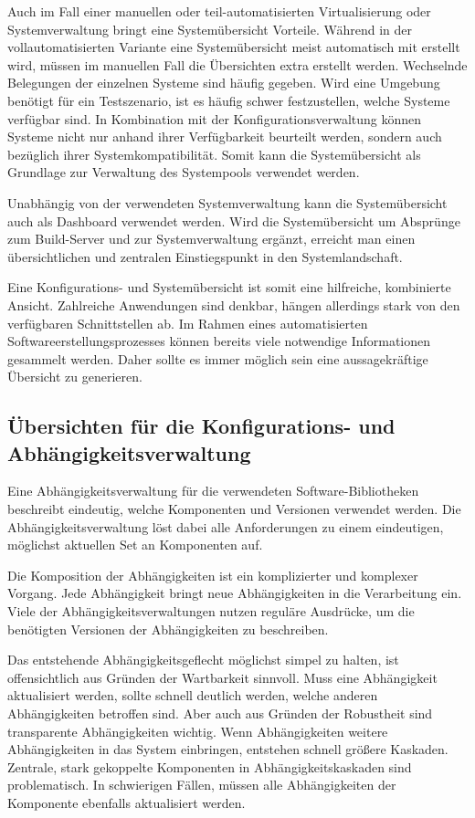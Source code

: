 Auch im Fall einer manuellen oder teil-automatisierten Virtualisierung oder Systemverwaltung bringt eine Systemübersicht Vorteile. Während in der vollautomatisierten Variante eine Systemübersicht meist automatisch mit erstellt wird, müssen im manuellen Fall die Übersichten extra erstellt werden. Wechselnde Belegungen der einzelnen Systeme sind häufig gegeben. Wird eine Umgebung benötigt für ein Testszenario, ist es häufig schwer festzustellen, welche Systeme verfügbar sind. In Kombination mit der Konfigurationsverwaltung können Systeme nicht nur anhand ihrer Verfügbarkeit beurteilt werden, sondern auch bezüglich ihrer Systemkompatibilität. Somit kann die Systemübersicht als Grundlage zur Verwaltung des Systempools verwendet werden.

Unabhängig von der verwendeten Systemverwaltung kann die Systemübersicht auch als Dashboard verwendet werden. Wird die Systemübersicht um Absprünge zum Build-Server und zur Systemverwaltung ergänzt, erreicht man einen übersichtlichen und zentralen Einstiegspunkt in den Systemlandschaft.

Eine Konfigurations- und Systemübersicht ist somit eine hilfreiche, kombinierte Ansicht. Zahlreiche Anwendungen sind denkbar, hängen allerdings stark von den verfügbaren Schnittstellen ab. Im Rahmen eines automatisierten Softwareerstellungsprozesses können bereits viele notwendige Informationen gesammelt werden. Daher sollte es immer möglich sein eine aussagekräftige Übersicht zu generieren.

\subsection{Übersichten für die Konfigurations- und Abhängigkeitsverwaltung}

Eine Abhängigkeitsverwaltung für die verwendeten Software-Bibliotheken beschreibt eindeutig, welche Komponenten und Versionen verwendet werden. Die Abhängigkeitsverwaltung löst dabei alle Anforderungen zu einem eindeutigen, möglichst aktuellen Set an Komponenten auf. 

Die Komposition der Abhängigkeiten ist ein komplizierter und komplexer Vorgang. Jede Abhängigkeit bringt neue Abhängigkeiten in die Verarbeitung ein. Viele der Abhängigkeitsverwaltungen nutzen reguläre Ausdrücke, um die benötigten Versionen der Abhängigkeiten zu beschreiben.

Das entstehende Abhängigkeitsgeflecht möglichst simpel zu halten, ist offensichtlich aus Gründen der Wartbarkeit sinnvoll. Muss eine Abhängigkeit aktualisiert werden, sollte schnell deutlich werden, welche anderen Abhängigkeiten betroffen sind.
Aber auch aus Gründen der Robustheit sind transparente Abhängigkeiten wichtig. Wenn Abhängigkeiten weitere Abhängigkeiten in das System einbringen, entstehen schnell größere Kaskaden. Zentrale, stark gekoppelte Komponenten in Abhängigkeitskaskaden sind problematisch. In schwierigen Fällen, müssen alle Abhängigkeiten der Komponente ebenfalls aktualisiert werden.

